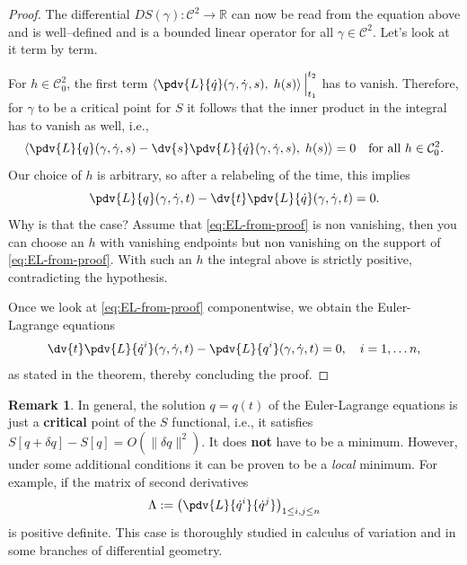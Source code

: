 \documentclass[english,fontsize=11pt,paper=b5]{scrbook}
\numberwithin{equation}{chapter}
\theoremstyle{definition}
\newtheorem{remark}{Remark}[chapter]
\begin{document}
\begin{proof}
      The differential $DS(\gamma): {\mathcal{C}^2} \to \mathbb{R}$ can now be read from the equation above and is well--defined and is a bounded linear operator for all $\gamma\in {\mathcal{C}^2}$. Let's look at it term by term.\medskip

      For $h\in \mathcal{C}^2_0$, the first term $\left\langle\pdv{L}{\dot q}(\gamma, \dot \gamma, s),\; h(s)\right\rangle\Big|_{t_1}^{t_2}$ has to vanish. Therefore, for $\gamma$ to be a critical point for $S$ it follows that the inner product in the integral has to vanish as well, i.e.,
      \begin{equation}
        \left\langle
          \pdv{L}{q}(\gamma, \dot \gamma, s)
          - \dv{s}\pdv{L}{\dot q}(\gamma, \dot \gamma, s)
        ,\; h(s)\right\rangle = 0 \quad\mbox{for all } h\in \mathcal{C}^2_0.
      \end{equation}
      Our choice of $h$ is arbitrary, so after a relabeling of the time, this implies
      \begin{equation}\label{eq:EL-from-proof}
        \pdv{L}{q}(\gamma, \dot \gamma, t)
        - \dv{t}\pdv{L}{\dot q}(\gamma, \dot \gamma, t) = 0.
      \end{equation}
      Why is that the case? Assume that \eqref{eq:EL-from-proof} is non vanishing, then you can choose an $h$ with vanishing endpoints but non vanishing on the support of \eqref{eq:EL-from-proof}. With such an $h$ the integral above is strictly positive, contradicting the hypothesis.

      Once we look at \eqref{eq:EL-from-proof} componentwise, we obtain the Euler-Lagrange equations
      \begin{equation}
        \dv{t}\pdv{L}{\dot q^i}(\gamma, \dot \gamma, t) - \pdv{L}{q^i}(\gamma, \dot \gamma, t) = 0, \quad i=1,\ldots n,
      \end{equation}
      as stated in the theorem, thereby concluding the proof.
    \end{proof}

    \begin{remark}
      In general, the solution $q=q(t)$ of the Euler-Lagrange equations is just a \textbf{critical} point of the $S$ functional, i.e., it satisfies $S[q + \delta q] - S[q] = O(\|\delta q\|^2)$.
      It does \textbf{not} have to be a minimum.
      However, under some additional conditions it can be proven to be a \emph{local} minimum.
      For example, if the matrix of second derivatives
      \begin{equation}\label{eq:hsd}
        \Lambda := \left( \pdv{L}{\dot q^i}{\dot q^j} \right)_{1\leq i,j\leq n}
      \end{equation}
      is positive definite.
      This case is thoroughly studied in calculus of variation and in some branches of differential geometry.
    \end{remark}
\end{document}
